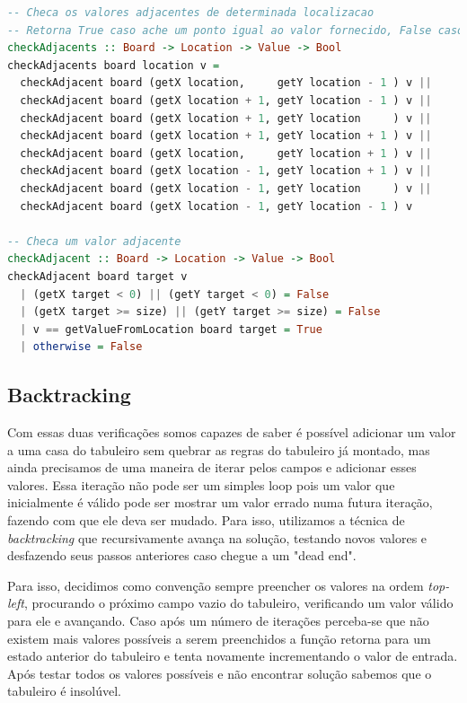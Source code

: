 \documentclass[12pt]{article}
\begin{document}
\begin{lstlisting}[language=Haskell]
-- Checa os valores adjacentes de determinada localizacao
-- Retorna True caso ache um ponto igual ao valor fornecido, False caso o contrario
checkAdjacents :: Board -> Location -> Value -> Bool
checkAdjacents board location v = 
  checkAdjacent board (getX location,     getY location - 1 ) v ||
  checkAdjacent board (getX location + 1, getY location - 1 ) v ||
  checkAdjacent board (getX location + 1, getY location     ) v ||
  checkAdjacent board (getX location + 1, getY location + 1 ) v ||
  checkAdjacent board (getX location,     getY location + 1 ) v ||
  checkAdjacent board (getX location - 1, getY location + 1 ) v ||
  checkAdjacent board (getX location - 1, getY location     ) v ||
  checkAdjacent board (getX location - 1, getY location - 1 ) v

-- Checa um valor adjacente
checkAdjacent :: Board -> Location -> Value -> Bool
checkAdjacent board target v
  | (getX target < 0) || (getY target < 0) = False
  | (getX target >= size) || (getY target >= size) = False
  | v == getValueFromLocation board target = True
  | otherwise = False
\end{lstlisting}

\subsection{Backtracking}

Com essas duas verificações somos capazes de saber é possível adicionar um valor a uma casa do tabuleiro sem quebrar as regras do tabuleiro já montado, mas ainda precisamos de uma maneira de iterar pelos campos e adicionar esses valores. Essa iteração não pode ser um simples loop pois um valor que inicialmente é válido pode ser mostrar um valor errado numa futura iteração, fazendo com que ele deva ser mudado. Para isso, utilizamos a técnica de \emph{backtracking} que recursivamente avança na solução, testando novos valores e desfazendo seus passos anteriores caso chegue a um "dead end".

Para isso, decidimos como convenção sempre preencher os valores na ordem \emph{top-left}, procurando o próximo campo vazio do tabuleiro, verificando um valor válido para ele e avançando. Caso após um número de iterações perceba-se que não existem mais valores possíveis a serem preenchidos a função retorna para um estado anterior do tabuleiro e tenta novamente incrementando o valor de entrada. Após testar todos os valores possíveis e não encontrar solução sabemos que o tabuleiro é insolúvel.
\end{document}
